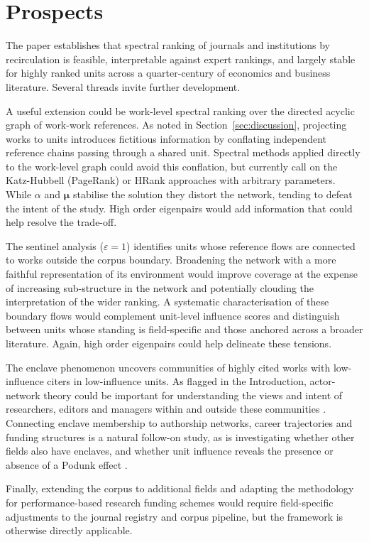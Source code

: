 \section{Prospects}
\label{sec:prospects}

The paper establishes that spectral ranking of journals and institutions
by recirculation is feasible, interpretable against expert rankings, and largely stable for highly ranked units 
across a quarter-century of economics and business literature. Several threads
invite further development.

A useful extension could be work-level spectral ranking over the directed
acyclic graph of work-work references. As noted in Section~\ref{sec:discussion},
projecting works to units introduces fictitious information by conflating independent
reference chains passing through a shared unit. Spectral methods applied directly to
the work-level graph could avoid this conflation, but currently call on the Katz-Hubbell 
(PageRank) or HRank approaches with arbitrary parameters. While $\alpha$ and $\mathbf{\mu}$ stabilise the solution they 
distort the network, tending to defeat the intent of the study. High order eigenpairs would add information 
that could help resolve the trade-off.

The sentinel analysis ($\varepsilon=1$) identifies units whose reference flows are
connected to works outside the corpus boundary. Broadening the network with a more 
faithful representation of its environment would improve coverage at the expense of 
increasing sub-structure in the network and  
potentially clouding the interpretation of the wider ranking. A systematic
characterisation of these boundary flows would complement unit-level influence scores
and distinguish between units whose standing is field-specific and those anchored across a
broader literature. Again, high order eigenpairs could help delineate these tensions.

The enclave phenomenon uncovers communities of highly cited works with low-influence citers in low-influence
units. As flagged in the Introduction, actor-network theory could be important for
understanding the views and intent of researchers, editors and managers within and outside these communities
\citep{latourReassemblingSocialIntroduction2007}. Connecting enclave membership to
authorship networks, career trajectories and funding structures is a natural follow-on
study, as is investigating whether other fields also have enclaves, and whether unit influence reveals the presence or absence of a Podunk effect \citep{gastonRewardSystemBritish1978, mahbubaMatthewEffectRelation2011}.

Finally, extending the corpus to additional fields and adapting the methodology
for performance-based research funding schemes would require field-specific adjustments
to the journal registry and corpus pipeline, but the framework is otherwise directly
applicable.

